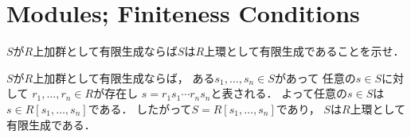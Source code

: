 \section{Modules; Finiteness Conditions}

\begin{prob}
  $S$が$R$上加群として有限生成ならば$S$は$R$上環として有限生成であることを示せ．
\end{prob}
\begin{ans}
  $S$が$R$上加群として有限生成ならば，
  ある$s_1, \dots , s_n \in S$があって
  任意の$s\in S$に対して
  $r_1, \dots, r_n \in R$が存在し
  $s = r_1 s_1 \cdots r_n s_n $と表される．
  よって任意の$s \in S$は
  $s \in R[s_1, \dots, s_n ]$である．
  したがって$S = R[s_1, \dots, s_n ]$であり，
  $S$は$R$上環として有限生成である．
\end{ans}


